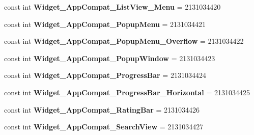 \begin{DoxyCompactItemize}
\item 
\hypertarget{classClient_1_1Droid_1_1Resource_1_1Style_a2ee8131f7d7b24357d4f0d771d09abb7}{}const int {\bfseries Widget\+\_\+\+App\+Compat\+\_\+\+List\+View\+\_\+\+Menu} = 2131034420\label{classClient_1_1Droid_1_1Resource_1_1Style_a2ee8131f7d7b24357d4f0d771d09abb7}

\item 
\hypertarget{classClient_1_1Droid_1_1Resource_1_1Style_a27640ab8c7d3d64a988f9158ae3c0e60}{}const int {\bfseries Widget\+\_\+\+App\+Compat\+\_\+\+Popup\+Menu} = 2131034421\label{classClient_1_1Droid_1_1Resource_1_1Style_a27640ab8c7d3d64a988f9158ae3c0e60}

\item 
\hypertarget{classClient_1_1Droid_1_1Resource_1_1Style_aaa9ffaa514a19df269d6b2ecf89aaa67}{}const int {\bfseries Widget\+\_\+\+App\+Compat\+\_\+\+Popup\+Menu\+\_\+\+Overflow} = 2131034422\label{classClient_1_1Droid_1_1Resource_1_1Style_aaa9ffaa514a19df269d6b2ecf89aaa67}

\item 
\hypertarget{classClient_1_1Droid_1_1Resource_1_1Style_a46eab4b94704f592c0c5bd3ec7fd2dbe}{}const int {\bfseries Widget\+\_\+\+App\+Compat\+\_\+\+Popup\+Window} = 2131034423\label{classClient_1_1Droid_1_1Resource_1_1Style_a46eab4b94704f592c0c5bd3ec7fd2dbe}

\item 
\hypertarget{classClient_1_1Droid_1_1Resource_1_1Style_aede7b5ba776dc428cff1595f1f8411fc}{}const int {\bfseries Widget\+\_\+\+App\+Compat\+\_\+\+Progress\+Bar} = 2131034424\label{classClient_1_1Droid_1_1Resource_1_1Style_aede7b5ba776dc428cff1595f1f8411fc}

\item 
\hypertarget{classClient_1_1Droid_1_1Resource_1_1Style_a54c94e7386ff547022b2af1b4b1689da}{}const int {\bfseries Widget\+\_\+\+App\+Compat\+\_\+\+Progress\+Bar\+\_\+\+Horizontal} = 2131034425\label{classClient_1_1Droid_1_1Resource_1_1Style_a54c94e7386ff547022b2af1b4b1689da}

\item 
\hypertarget{classClient_1_1Droid_1_1Resource_1_1Style_ac36da1494d6059b1850d9dc11906521b}{}const int {\bfseries Widget\+\_\+\+App\+Compat\+\_\+\+Rating\+Bar} = 2131034426\label{classClient_1_1Droid_1_1Resource_1_1Style_ac36da1494d6059b1850d9dc11906521b}

\item 
\hypertarget{classClient_1_1Droid_1_1Resource_1_1Style_a9303afab185eeaf882ec429afbb3b956}{}const int {\bfseries Widget\+\_\+\+App\+Compat\+\_\+\+Search\+View} = 2131034427\label{classClient_1_1Droid_1_1Resource_1_1Style_a9303afab185eeaf882ec429afbb3b956}


\end{DoxyCompactItemize}
